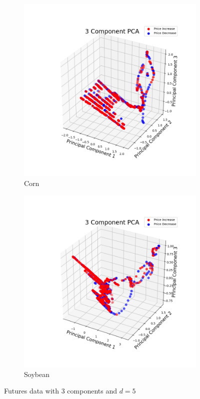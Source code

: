 \documentclass{article}
\begin{document}
\begin{figure}[h!]
\centering
\begin{subfigure}{.5\textwidth}
  \centering
  \includegraphics[scale=.4]{imagesmid/cornmkt5,3d}
\caption{Corn}
\end{subfigure}%
\begin{subfigure}{.5\textwidth}
  \centering
  \includegraphics[scale=.4]{imagesmid/soymkt5,3d}
\caption{Soybean}
\end{subfigure}
\caption{Futures data with 3 components and $d=5$}
\end{figure}
\end{document}
